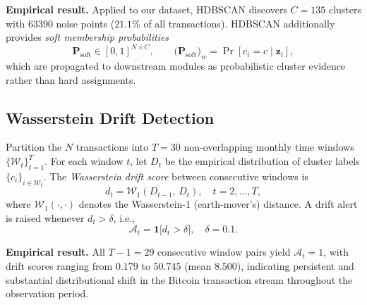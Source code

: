 \noindent\textbf{Empirical result.}
Applied to our dataset, HDBSCAN discovers $C = 135$ clusters with
\num{63390} noise points ($21.1\%$ of all transactions).
HDBSCAN additionally provides \emph{soft membership probabilities}
\begin{equation}
  \mathbf{P}_{\mathrm{soft}}
    \in [0,1]^{N\times C},
  \qquad
  \bigl(\mathbf{P}_{\mathrm{soft}}\bigr)_{ic}
    = \Pr[c_{i} = c \mid \mathbf{z}_{i}],
  \label{eq:soft}
\end{equation}
which are propagated to downstream modules as probabilistic cluster
evidence rather than hard assignments.

\subsection{Wasserstein Drift Detection}
\label{subsec:wasserstein}

\begin{definition}
\label{def:drift}
Partition the $N$ transactions into $T=30$ non-overlapping monthly time
windows $\{\mathcal{W}_{t}\}_{t=1}^{T}$.
For each window $t$, let $D_t$ be the empirical distribution of cluster
labels $\{c_{i}\}_{i\in\mathcal{W}_{t}}$.
The \emph{Wasserstein drift score} between consecutive windows is
\begin{equation}
  d_{t}
    = \mathcal{W}_{1}(D_{t-1},\, D_{t}),
  \quad t = 2,\ldots,T,
  \label{eq:wasserstein}
\end{equation}
where $\mathcal{W}_{1}(\cdot,\cdot)$ denotes the Wasserstein-$1$
(earth-mover's) distance.  A drift alert is raised whenever
$d_{t} > \delta$, i.e.,
\begin{equation}
  \mathcal{A}_{t} = \mathbf{1}\!\bigl[d_{t} > \delta\bigr],
  \quad \delta = 0.1.
  \label{eq:alert}
\end{equation}
\end{definition}

\noindent\textbf{Empirical result.}
All $T-1 = 29$ consecutive window pairs yield $\mathcal{A}_{t}=1$, with
drift scores ranging from $0.179$ to $50.745$ (mean $8.500$), indicating
persistent and substantial distributional shift in the Bitcoin transaction
stream throughout the observation period.

